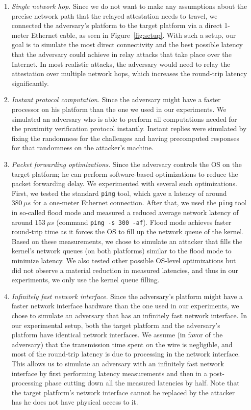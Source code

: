 \begin{enumerate}
	\item \emph{Single network hop.} Since we do not want to make any assumptions about the precise network path that the relayed attestation needs to travel, we connected the adversary's platform to the target platform via a direct 1-meter Ethernet cable, as seen in Figure~\ref{fig:setup}. With such a setup, our goal is to simulate the most direct connectivity and the best possible latency that the adversary could achieve in relay attacks that take place over the Internet. In most realistic attacks, the adversary would need to relay the attestation over multiple network hops, which increases the round-trip latency significantly. 

	\item \emph{Instant protocol computation.} Since the adversary might have a faster processor on his platform than the one we used in our experiments. We simulated an adversary who is able to perform all computations needed for the proximity verification protocol instantly. Instant replies were simulated by fixing the randomness for the challenges and having precomputed responses for that randomness on the attacker's machine.

	\item \emph{Packet forwarding optimizations.} Since the adversary controls the OS on the target platform; he can perform software-based optimizations to reduce the packet forwarding delay. We experimented with several such optimizations. First, we tested the standard \texttt{ping} tool, which gave a latency of around $380\ \mu s$ for a one-meter Ethernet connection. After that, we used the \texttt{ping} tool in so-called flood mode and measured a reduced average network latency of around $153\ \mu s$ (command \texttt{ping -s 300 -af}). Flood mode achieves faster round-trip time as it forces the OS to fill up the network queue of the kernel. Based on these measurements, we chose to simulate an attacker that fills the kernel's network queues (on both platforms) similar to the flood mode to minimize latency. We also tested other possible OS-level optimizations but did not observe a material reduction in measured latencies, and thus in our experiments, we only use the kernel queue filling.
	
	\item \emph{Infinitely fast network interface.} Since the adversary's platform might have a faster network interface hardware than the one used in our experiments, we chose to simulate an adversary that has an infinitely fast network interface. In our experimental setup, both the target platform and the adversary's platform have identical network interfaces. We assume (in favor of the adversary) that the transmission time spent on the wire is negligible, and most of the round-trip latency is due to processing in the network interface. This allows us to simulate an adversary with an infinitely fast network interface by first performing latency measurements and then in a post-processing phase cutting down all the measured latencies by half. Note that the target platform's network interface cannot be replaced by the attacker has he does not have physical access to it.
\end{enumerate}

